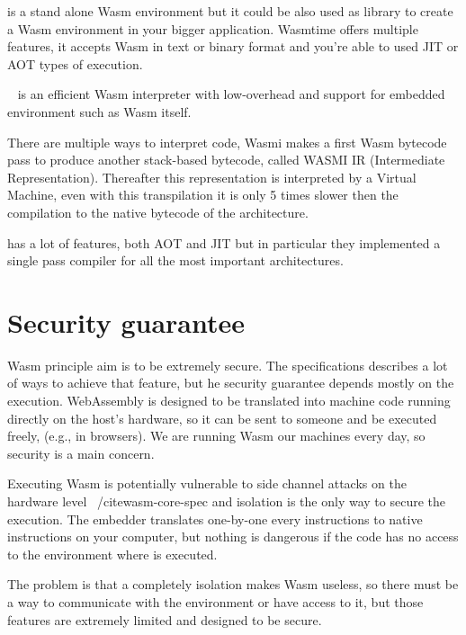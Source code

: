\begin{description}[font=$\bullet$ \scshape\bfseries]
  \item[Wasmtime]
        is a stand alone Wasm environment but it could be also used as library to create a Wasm environment in your bigger application. Wasmtime offers multiple features, it accepts Wasm in text or binary format and you're able to used JIT or AOT types of execution.
  \item[Wasmi]
        ~\cite{wasmi} is an efficient Wasm interpreter with low-overhead and support for embedded environment such as Wasm itself.

        There are multiple ways to interpret code, Wasmi makes a first Wasm bytecode pass to produce another stack-based bytecode, called WASMI IR (Intermediate Representation). Thereafter this representation is interpreted by a Virtual Machine, even with this transpilation it is only 5 times slower then the compilation to the native bytecode of the architecture.

        \item[Wasmer] has a lot of features, both AOT and JIT but in particular they implemented a single pass compiler for all the most important architectures.
\end{description}

\section{Security guarantee}

Wasm principle aim is to be extremely secure. The specifications describes a lot of ways to achieve that feature, but he security guarantee depends mostly on the execution. WebAssembly is designed to be translated into machine code running directly on the host’s hardware, so it can be sent to someone and be executed freely, (e.g., in browsers). We are running Wasm our machines every day, so security is a main concern.

Executing Wasm is potentially vulnerable to side channel attacks on the hardware level ~/cite{wasm-core-spec} and isolation is the only way to secure the execution.  The embedder translates one-by-one every instructions to native instructions on your computer, but nothing is dangerous if the code has no access to the environment where is executed.

The problem is that a completely isolation makes Wasm useless, so there must be a way to communicate with the environment or  have access to it, but those features are extremely limited and designed to be secure.

